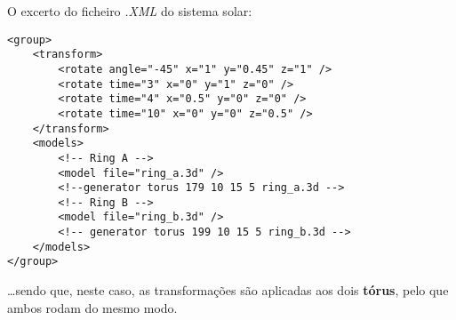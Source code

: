 \documentclass[relatorio.tex]{subfiles}
\begin{document}
O excerto do ficheiro \textit{.XML} do sistema solar:
\begin{code}
\label{code:saturno_aneis}
\begin{verbatim}
<group>
    <transform>
        <rotate angle="-45" x="1" y="0.45" z="1" />
        <rotate time="3" x="0" y="1" z="0" />
        <rotate time="4" x="0.5" y="0" z="0" />
        <rotate time="10" x="0" y="0" z="0.5" />
    </transform>
    <models>
        <!-- Ring A -->
        <model file="ring_a.3d" />
        <!--generator torus 179 10 15 5 ring_a.3d -->
        <!-- Ring B -->
        <model file="ring_b.3d" />
        <!-- generator torus 199 10 15 5 ring_b.3d -->
    </models>
</group>
\end{verbatim}
\end{code}
\dots sendo que, neste caso, as transformações são aplicadas aos dois \textbf{tórus}, pelo 
que ambos rodam do mesmo modo. 
\end{document}
